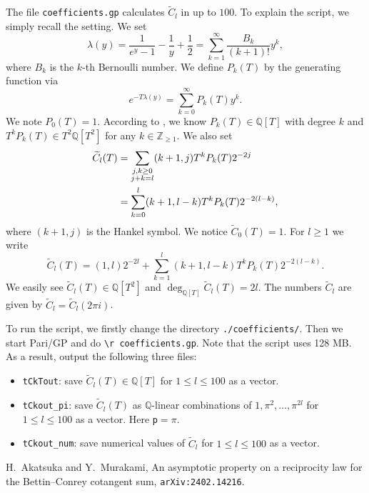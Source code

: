 \documentclass[11pt]{amsart}
\newcommand{\wC}{\widetilde{C}}
\newcommand{\Z}{\mathbb{Z}}
\newcommand{\Q}{\mathbb{Q}}
\begin{document}
The file \verb|coefficients.gp| calculates $\wC_l$ in \cite[eq.~(5.2)]{AM}
up to $100$.
To explain the script, we simply recall the setting.
We set
\[
 \lambda(y)=\frac{1}{e^y-1}-\frac{1}{y}+\frac{1}{2}=\sum_{k=1}^{\infty}\frac{B_k}{(k+1)!}y^k,
\]
where $B_k$ is the $k$-th Bernoulli number.
We define $P_k(T)$ by the generating function via
\[
 e^{-T\lambda(y)}=\sum_{k=0}^{\infty} P_k(T)y^k.
\]
We note $P_0(T)=1$.
According to \cite[Corollaries 5.4 and 5.5]{AM}, we know
$P_k(T)\in\Q[T]$ with degree $k$ and $T^k P_k(T)\in T^2 \Q[T^2]$
for any $k\in\Z_{\geq 1}$.
We also set
\begin{align*}
 \wC_l(T)
&=\sum_{\begin{subarray}{c}
           j,k\geq 0\\
	j+k=l
       \end{subarray}}
(k+1,j)T^k P_k(T)2^{-2j}\\
&=\sum_{k=0}^l (k+1,l-k)T^kP_k(T) 2^{-2(l-k)},
\end{align*}
where $(k+1,j)$ is the Hankel symbol.
We notice $\wC_0(T)=1$.
For $l\geq 1$ we write
\[
 \wC_l(T)=(1,l)2^{-2l}+\sum_{k=1}^l (k+1,l-k)T^kP_k(T) 2^{-2(l-k)}.
\]
We easily see $\wC_l(T)\in\Q[T^2]$ and $\deg_{\Q[T]}\wC_l(T)=2l$.
The numbers $\wC_l$ are given by $\wC_l=\wC_l(2\pi i)$.

To run the script, we firstly change the directory \verb|./coefficients/|.
Then we start Pari/GP and do \verb|\r coefficients.gp|.
Note that the script uses 128 MB.
As a result, output the following three files:
\begin{itemize}
 \item \verb|tCkTout|: save $\wC_l(T)\in\Q[T]$ for $1\leq l\leq 100$ as
a vector.
\item \verb|tCkout_pi|: save $\wC_l(T)$ as $\Q$-linear combinations
of $1,\pi^2,\ldots,\pi^{2l}$ for $1\leq l\leq 100$ as a vector.
Here \verb|p|$=\pi$.
\item \verb|tCkout_num|: save numerical values of $\wC_l$ for
$1\leq l\leq 100$ as a vector.
\end{itemize}
\begin{thebibliography}{99}
H.~Akatsuka and Y.~Murakami,
An asymptotic property on a reciprocity law for the Bettin--Conrey
cotangent sum, {\tt arXiv:2402.14216}.
\end{thebibliography}
\end{document}
